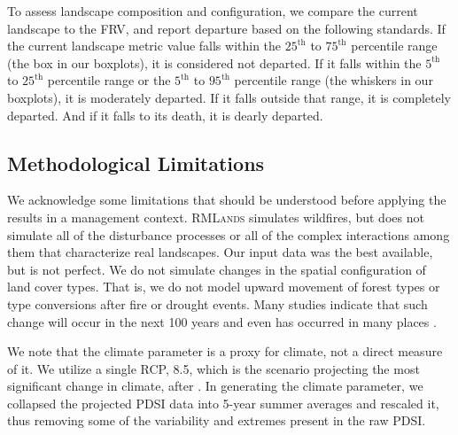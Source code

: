 To assess landscape composition and configuration, we compare the current landscape to the FRV, and report departure based on the following standards. If the current landscape metric value falls within the $25^{\text{th}}$ to $75^{\text{th}}$ percentile range (the box in our boxplots), it is considered not departed. If it falls within the $5^{\text{th}}$ to $25^{\text{th}}$ percentile range or the $5^{\text{th}}$ to $95^{\text{th}}$ percentile range (the whiskers in our boxplots), it is moderately departed. If it falls outside that range, it is completely departed. And if it falls to its death, it is dearly departed.



\subsection*{Methodological Limitations}
We acknowledge some limitations that should be understood before applying the results in a management context. \textsc{RMLands} simulates wildfires, but does not simulate all of the disturbance processes or all of the complex interactions among them that characterize real landscapes. Our input data was the best available, but is not perfect. We do not simulate changes in the spatial configuration of land cover types. That is, we do not model upward movement of forest types or type conversions after fire or drought events. Many studies indicate that such change will occur in the next 100 years and even has occurred in many places \citep{Bachelet2001}.

We note that the climate parameter is a proxy for climate, not a direct measure of it. We utilize a single RCP, 8.5, which is the scenario projecting the most significant change in climate, after \citet{Cook2014}. In generating the climate parameter, we collapsed the projected PDSI data into 5-year summer averages and rescaled it, thus removing some of the variability and extremes present in the raw PDSI.












